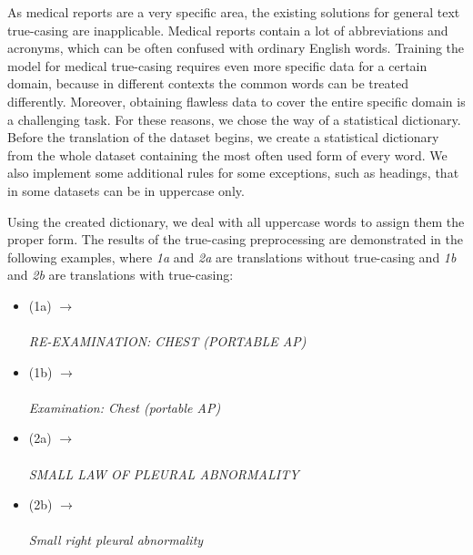 As medical reports are a very specific area, the existing solutions for general text true-casing are inapplicable. Medical reports contain a lot of abbreviations and acronyms, which can be often confused with ordinary English words. Training the model for medical true-casing requires even more specific data for a certain domain, because in different contexts the common words can be treated differently. Moreover, obtaining flawless data to cover the entire specific domain is a challenging task. For these reasons, we chose the way of a statistical dictionary. Before the translation of the dataset begins, we create a statistical dictionary from the whole dataset containing the most often used form of every word. We also implement some additional rules for some exceptions, such as headings, that in some datasets can be in uppercase only.\\
\newpage

Using the created dictionary, we deal with all uppercase words to assign them the proper form. The results of the true-casing preprocessing are demonstrated in the following examples, where \textit{1a} and \textit{2a} are translations without true-casing and \textit{1b} and \textit{2b} are translations with true-casing:
\begin{itemize}
	\item (1a)  $\rightarrow$ \\ \phantom{(1a)}  \\ \phantom{(1a)} \textit{RE-EXAMINATION: CHEST (PORTABLE AP)}
	\item (1b)  $\rightarrow$ \\ \phantom{(1b)}  \\ \phantom{(1b)} \textit{Examination: Chest (portable AP)}
	\item (2a)  $\rightarrow$ \\ \phantom{(2a)}  \\ \phantom{(2a)} \textit{SMALL LAW OF PLEURAL ABNORMALITY}
	\item (2b)  $\rightarrow$ \\ \phantom{(2b)}  \\ \phantom{(2b)} \textit{Small right pleural abnormality}
\end{itemize}

